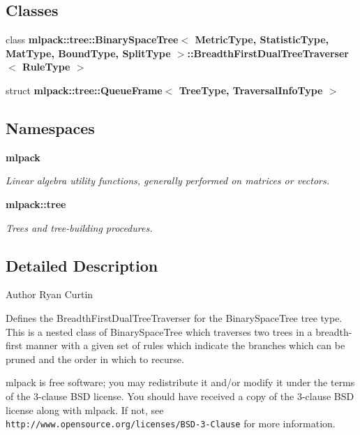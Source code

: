 \subsection*{Classes}
\begin{DoxyCompactItemize}
\item 
class {\bf mlpack\+::tree\+::\+Binary\+Space\+Tree$<$ Metric\+Type, Statistic\+Type, Mat\+Type, Bound\+Type, Split\+Type $>$\+::\+Breadth\+First\+Dual\+Tree\+Traverser$<$ Rule\+Type $>$}
\item 
struct {\bf mlpack\+::tree\+::\+Queue\+Frame$<$ Tree\+Type, Traversal\+Info\+Type $>$}
\end{DoxyCompactItemize}
\subsection*{Namespaces}
\begin{DoxyCompactItemize}
\item 
 {\bf mlpack}
\begin{DoxyCompactList}\small\item\em Linear algebra utility functions, generally performed on matrices or vectors. \end{DoxyCompactList}\item 
 {\bf mlpack\+::tree}
\begin{DoxyCompactList}\small\item\em Trees and tree-\/building procedures. \end{DoxyCompactList}\end{DoxyCompactItemize}


\subsection{Detailed Description}
\begin{DoxyAuthor}{Author}
Ryan Curtin
\end{DoxyAuthor}
Defines the Breadth\+First\+Dual\+Tree\+Traverser for the Binary\+Space\+Tree tree type. This is a nested class of Binary\+Space\+Tree which traverses two trees in a breadth-\/first manner with a given set of rules which indicate the branches which can be pruned and the order in which to recurse.

mlpack is free software; you may redistribute it and/or modify it under the terms of the 3-\/clause B\+SD license. You should have received a copy of the 3-\/clause B\+SD license along with mlpack. If not, see {\tt http\+://www.\+opensource.\+org/licenses/\+B\+S\+D-\/3-\/\+Clause} for more information. 